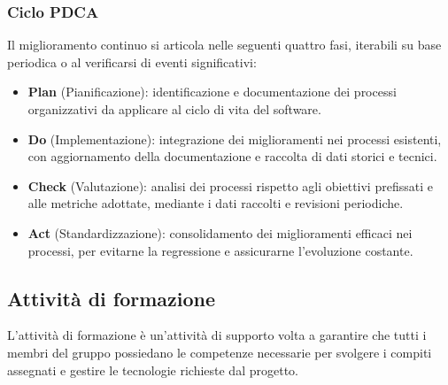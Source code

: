 \subsubsection{Ciclo PDCA}
Il miglioramento continuo si articola nelle seguenti quattro fasi, iterabili su base periodica o al verificarsi di eventi significativi:
\begin{itemize}[itemsep=3pt, parsep=1pt, label=$\scriptstyle\bullet$]
    \item \textbf{Plan} (Pianificazione): identificazione e documentazione dei processi organizzativi da applicare al ciclo di vita del software.
    \item \textbf{Do} (Implementazione): integrazione dei miglioramenti nei processi esistenti, con aggiornamento della documentazione e raccolta di dati storici e tecnici.
    \item \textbf{Check} (Valutazione): analisi dei processi rispetto agli obiettivi prefissati e alle metriche adottate, mediante i dati raccolti e revisioni periodiche.
    \item \textbf{Act} (Standardizzazione): consolidamento dei miglioramenti efficaci nei processi, per evitarne la regressione e assicurarne l'evoluzione costante.
\end{itemize}

\subsection{Attività di formazione}
L'attività di formazione è un'attività di supporto volta a garantire che tutti i membri del gruppo possiedano le competenze necessarie per svolgere i compiti assegnati e gestire le tecnologie richieste dal progetto.

